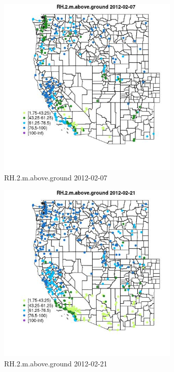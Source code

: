\begin{figure} 
\centering  
\includegraphics[width=0.77\textwidth]{Code_Outputs/Report_ML_input_PM25_Step4_part_f_de_duplicated_aves_prioritize_24hr_obswNAs_MapObsRH2maboveground2012-02-07.jpg} 
\caption{\label{fig:Report_ML_input_PM25_Step4_part_f_de_duplicated_aves_prioritize_24hr_obswNAsMapObsRH2maboveground2012-02-07}RH.2.m.above.ground 2012-02-07} 
\end{figure} 
 

\begin{figure} 
\centering  
\includegraphics[width=0.77\textwidth]{Code_Outputs/Report_ML_input_PM25_Step4_part_f_de_duplicated_aves_prioritize_24hr_obswNAs_MapObsRH2maboveground2012-02-21.jpg} 
\caption{\label{fig:Report_ML_input_PM25_Step4_part_f_de_duplicated_aves_prioritize_24hr_obswNAsMapObsRH2maboveground2012-02-21}RH.2.m.above.ground 2012-02-21} 
\end{figure} 
 

